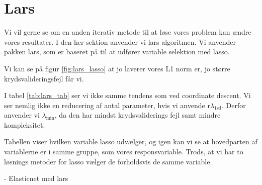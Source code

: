 \section{Lars}
Vi vil gerne se om en anden iterativ metode til at løse vores problem kan ændre vores resultater. 
I den her sektion anvender vi lars algoritmen. 
Vi anvender pakken lars, som er baseret på  \citep{lars} til at udfører variable selektion med lasso.

Vi kan se på figur \ref{fig:lars_lasso} at jo laverer vores L1 norm er, jo større krydsvalideringsfejl får vi.  


I tabel \ref{tab:lars_tab} ser vi ikke samme tendens som ved coordinate descent. 
Vi ser nemlig ikke en reducering af antal parameter, hvis vi anvende r$\lambda_{1\text{sd}}$.
Derfor anvender vi $\lambda_{\min}$, da den har mindst krydsvaliderings fejl samt mindre kompleksitet. 





Tabellen viser hvilken variable lasso udvælger, og igen kan vi se at hovedparten af variablerne er i samme gruppe, som vores responsvariable. 
Trods, at vi har to løsnings metoder for lasso vælger de forholdsvis de samme variable.

- Elasticnet med lars 